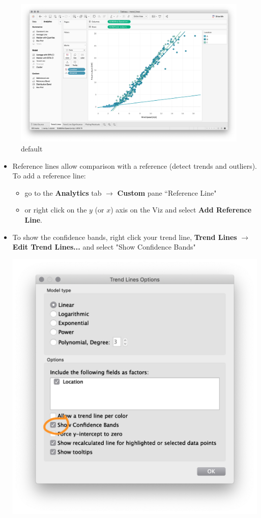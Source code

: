 \documentclass[xcolor=svgnames]{beamer} %
\begin{document}
\begin{frame}
\begin{figure}[htbp]
\includegraphics[width=.9\textwidth]{img/trippleTrend2}
\caption{default}
\label{trippleTrend2}
\end{figure}
\end{frame}


\begin{frame}
\begin{itemize}
\item Reference lines allow comparison with a reference (detect trends and outliers). To add a reference line:
\begin{itemize}
\item  go to the {\bf Analytics} tab $\to$ {\bf Custom} pane ``Reference Line"
\item or right click on the $y$ (or $x$) axis on the Viz and select {\bf Add Reference Line}.
\end{itemize}
\item To show the confidence bands, right click your trend line, {\bf Trend Lines} $\to$ {\bf Edit Trend Lines...} and select "Show Confidence Bands"
\begin{center}
\includegraphics[width=.45\textwidth]{img/CB}
\end{center}
\end{itemize}


\end{frame}
\end{document}
